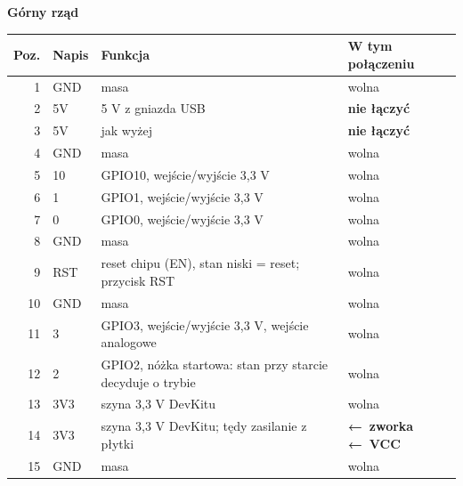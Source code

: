 \documentclass[10pt]{article}
\newcommand{\la}{{\sym ←}}
\begin{document}
\renewcommand{\arraystretch}{1.25}
\begin{minipage}[t]{0.49\linewidth}
\textbf{Górny rząd}\\[2pt]
\footnotesize
\begin{tabular}{@{}r l p{4.9cm} p{2.9cm}@{}}
\toprule
\rowcolor{black!8}\textbf{Poz.} & \textbf{Napis} & \textbf{Funkcja} & \textbf{W tym połączeniu} \\
\midrule
1 & GND & masa & wolna \\
2 & 5V & 5 V z gniazda USB & \textbf{nie łączyć} \\
3 & 5V & jak wyżej & \textbf{nie łączyć} \\
4 & GND & masa & wolna \\
5 & 10 & GPIO10, wejście/wyjście 3,3 V & wolna \\
6 & 1 & GPIO1, wejście/wyjście 3,3 V & wolna \\
7 & 0 & GPIO0, wejście/wyjście 3,3 V & wolna \\
8 & GND & masa & wolna \\
9 & RST & reset chipu (EN), stan niski = reset; przycisk RST & wolna \\
10 & GND & masa & wolna \\
11 & 3 & GPIO3, wejście/wyjście 3,3 V, wejście analogowe & wolna \\
12 & 2 & GPIO2, nóżka startowa: stan przy starcie decyduje o trybie & wolna \\
13 & 3V3 & szyna 3,3 V DevKitu & wolna \\
14 & 3V3 & szyna 3,3 V DevKitu; tędy zasilanie z płytki & {\color{pwrred}\textbf{\la\ zworka \la\ VCC}} \\
15 & GND & masa & wolna \\
\bottomrule
\end{tabular}
\end{minipage}\hfill
\end{document}
